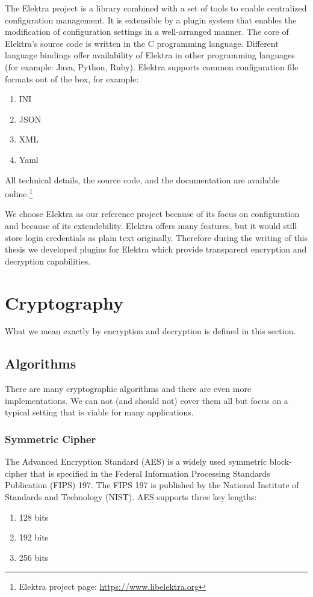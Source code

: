 The Elektra project is a library combined with a set of tools to enable centralized configuration management.
It is extensible by a plugin system that enables the modification of configuration settings in a well-arranged manner.
The core of Elektra's source code is written in the C programming language.
Different language bindings offer availability of Elektra in other programming languages (for example: Java, Python, Ruby).
Elektra supports common configuration file formats out of the box, for example:\cite{elektra-doc,raab2010thesis}
\begin{enumerate}
\item INI
\item JSON
\item XML
\item Yaml
\end{enumerate}

All technical details, the source code, and the documentation are available online.\footnote{Elektra project page: \url{https://www.libelektra.org}}

We choose Elektra as our reference project because of its focus on configuration and because of its extendebility.
Elektra offers many features, but it would still store login credentials as plain text originally.
Therefore during the writing of this thesis we developed plugins for Elektra which provide transparent encryption and decryption capabilities.

\section{Cryptography}

What we mean exactly by encryption and decryption is defined in this section.

\subsection{Algorithms}

There are many cryptographic algorithms and there are even more implementations.
We can not (and should not) cover them all but focus on a typical setting that is viable for many applications.

\subsubsection{Symmetric Cipher}

The Advanced Encryption Standard (AES) is a widely used symmetric block-cipher that is specified in the Federal Information Processing Standards Publication (FIPS) 197.
The FIPS 197 is published by the National Institute of Standards and Technology (NIST).\cite{fips197}
AES supports three key lengths:
\begin{enumerate}
  \item 128 bits
  \item 192 bits
  \item 256 bits
\end{enumerate}

